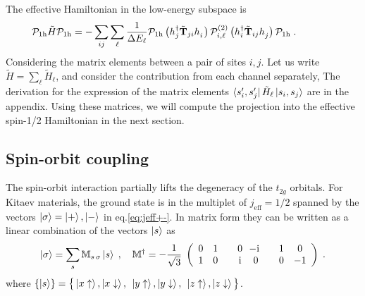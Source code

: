 The effective Hamiltonian in the low-energy subspace is
\begin{equation}\hspace*{-10mm}
    \begin{split}
        \mathcal{P}_{1\mathrm{h}} \tilde{H}  \mathcal{P}_{1\mathrm{h}}
      &= -
      \sum_{ij}\sum_{\ell} \frac{1}{\Delta E_{\ell}} \mathcal{P}_{1\mathrm{h}}  \, \big( h_j^\dagger  \tilde{\mathbf{T}}_{ji} h_i^{\phantom{\dagger}} \big) \, \mathcal{P}^{(2)}_{i,\ell} \, \big( h_i^\dagger  \tilde{\mathbf{T}}_{ij} h_j^{\phantom{\dagger}} \big)\, \mathcal{P}_{1\mathrm{h}} \; . \label{micro-Heff}
    \end{split}
\end{equation}
Considering the matrix elements between a pair of sites $i,j$. Let us write $\tilde{H}=\sum_{\ell} \tilde{H}_{\ell}$, and consider the contribution from each channel separately,
The derivation for the expression of the matrix elements $\bra{s_i', s_j'} \tilde{H}_{\ell}  \ket{s_i, s_j}$  are in the appendix.
Using these matrices, we will compute the projection into the effective spin-1/2 Hamiltonian in the next section.



\subsection{Spin-orbit coupling}
The spin-orbit interaction partially lifts the degeneracy of the $t_{2g}$ orbitals. For Kitaev materials, the ground state is in the multiplet of $j_{\text{eff}}=1/2$ spanned by the vectors $\ket{\sigma}=\ket{+},\ket{-}$ in eq.\eqref{eq:jeff+-}. In matrix form they can be written as a linear combination of the vectors $\ket{s}$  as
\begin{equation}
    \ket{\sigma} %
    = \sum_{s}
    \mathbb{M}_{s\,\sigma} \ket{s} \; , \quad
    \mathbb{M}^{\dagger} = -\frac{1}{\sqrt{3}} \;  \left(
\begin{array}{cccccccc}
     0&1&  &0&\!\!-\im&   &1&0  \\
     1&0&  &\im&0&  &0&-1
\end{array}
    \right) \; .
\end{equation} where $\{ \ket{s} \} =\big\{ \ket{x\uparrow},  \ket{x\downarrow}, \; \,\ket{y\uparrow},  \ket{y\downarrow}, \; \,\ket{z\uparrow},  \ket{z\downarrow} \big\}$.

